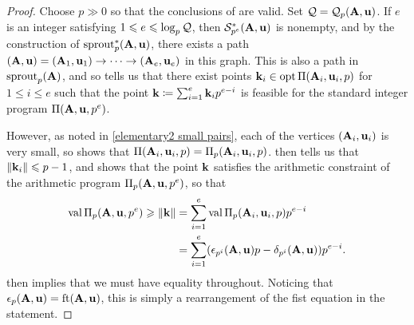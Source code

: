 \documentclass{amsart}
\begin{document}
\begin{proof}
   Choose $p \gg 0$ so that the conclusions of  are valid.
   Set $\mathcal{Q} = \mathcal{Q}_p(\mathbf{A},\mathbf{u})$.
   If $e$ is an integer satisfying $1 \leqslant e \leqslant \log_p\mathcal{Q}$, then $\mathcal{S}_{p^e}^{\ast}(\mathbf{A},\mathbf{u})$ is nonempty, and by the construction of $\operatorname{sprout}_p^{\ast}(\mathbf{A},\mathbf{u})$, there exists a path $(\mathbf{A},\mathbf{u}) = (\mathbf{A}_1, \mathbf{u}_1) \to \cdots \to (\mathbf{A}_e, \mathbf{u}_e)$ in this graph.
   This is also a path in $\operatorname{sprout}_p(\mathbf{A})$, and so  tells us that there exist points $\mathbf{k}_i \in \operatorname{opt} \Pi(\mathbf{A}_i, \mathbf{u}_i, p)$ for $1 \le i \le e$ such that the point $\mathbf{k} \coloneqq \sum_{i=1}^e \mathbf{k}_i p^{e-i}$ is feasible for the standard integer program $\Pi(\mathbf{A}, \mathbf{u}, p^e)$.

   However, as noted in \eqref{elementary2 small pairs}, each of the vertices $(\mathbf{A}_i, \mathbf{u}_i)$ is very small, so  shows that $\Pi(\mathbf{A}_i,\mathbf{u}_i,p) = \Pi_p(\mathbf{A}_i, \mathbf{u}_i, p)$.
    then tells us that $\| \mathbf{k}_i \| \leqslant p - 1$, and  shows that the point $\mathbf{k}$ satisfies the arithmetic constraint of the arithmetic program $\Pi_p(\mathbf{A},\mathbf{u},p^e)$, so that
   \begin{align*}
     \operatorname{val} \Pi_p(\mathbf{A},\mathbf{u},p^e) \geqslant  \| \mathbf{k} \| & = \sum_{i=1}^e \operatorname{val} \Pi_p(\mathbf{A}_i,\mathbf{u}_i,p) p^{e-i} \\
                                                  & = \sum_{i=1}^e (\epsilon_{p^i}(\mathbf{A},\mathbf{u})p - \delta_{p^i}(\mathbf{A},\mathbf{u})) p^{e-i}.
   \end{align*}
    then implies that we must have equality throughout.
   Noticing that $\epsilon_p(\mathbf{A},\mathbf{u}) = \operatorname{ft}(\mathbf{A}, \mathbf{u})$, this is simply a rearrangement of the fist equation in the statement.


\end{proof}
\end{document}
